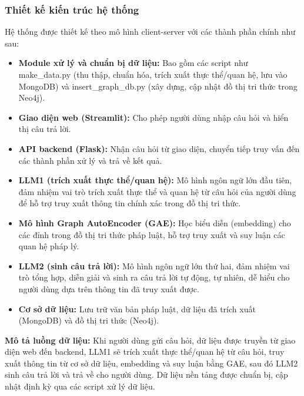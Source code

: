 \documentclass[a4paper]{article}
\begin{document}
\subsubsection{Thiết kế kiến trúc hệ thống}
Hệ thống được thiết kế theo mô hình client-server với các thành phần chính như sau:
\begin{itemize}
    \item \textbf{Module xử lý và chuẩn bị dữ liệu:} Bao gồm các script như make\_data.py (thu thập, chuẩn hóa, trích xuất thực thể/quan hệ, lưu vào MongoDB) và insert\_graph\_db.py (xây dựng, cập nhật đồ thị tri thức trong Neo4j).
    \item \textbf{Giao diện web (Streamlit):} Cho phép người dùng nhập câu hỏi và hiển thị câu trả lời.
    \item \textbf{API backend (Flask):} Nhận câu hỏi từ giao diện, chuyển tiếp truy vấn đến các thành phần xử lý và trả về kết quả.
    \item \textbf{LLM1 (trích xuất thực thể/quan hệ):} Mô hình ngôn ngữ lớn đầu tiên, đảm nhiệm vai trò trích xuất thực thể và quan hệ từ câu hỏi của người dùng để hỗ trợ truy xuất thông tin chính xác trong đồ thị tri thức.
    \item \textbf{Mô hình Graph AutoEncoder (GAE):} Học biểu diễn (embedding) cho các đỉnh trong đồ thị tri thức pháp luật, hỗ trợ truy xuất và suy luận các quan hệ pháp lý.
    \item \textbf{LLM2 (sinh câu trả lời):} Mô hình ngôn ngữ lớn thứ hai, đảm nhiệm vai trò tổng hợp, diễn giải và sinh ra câu trả lời tự động, tự nhiên, dễ hiểu cho người dùng dựa trên thông tin đã truy xuất được.
    \item \textbf{Cơ sở dữ liệu:} Lưu trữ văn bản pháp luật, dữ liệu đã trích xuất (MongoDB) và đồ thị tri thức (Neo4j).
\end{itemize}
\textbf{Mô tả luồng dữ liệu:} Khi người dùng gửi câu hỏi, dữ liệu được truyền từ giao diện web đến backend, LLM1 sẽ trích xuất thực thể/quan hệ từ câu hỏi, truy xuất thông tin từ cơ sở dữ liệu, embedding và suy luận bằng GAE, sau đó LLM2 sinh câu trả lời và trả về cho người dùng. Dữ liệu nền tảng được chuẩn bị, cập nhật định kỳ qua các script xử lý dữ liệu.
\end{document}
